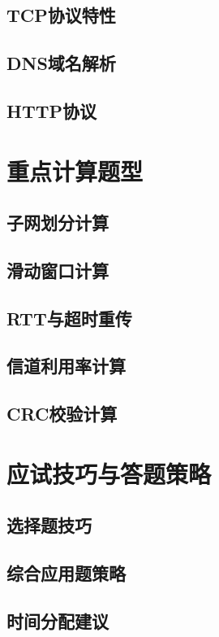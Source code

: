 \documentclass[lang=cn,newtx,10pt,scheme=chinese]{../../elegantbook}
\begin{document}
\subsection{TCP协议特性}
\subsection{DNS域名解析}
\subsection{HTTP协议}

\section{重点计算题型}
\subsection{子网划分计算}
\subsection{滑动窗口计算}
\subsection{RTT与超时重传}
\subsection{信道利用率计算}
\subsection{CRC校验计算}

\section{应试技巧与答题策略}
\subsection{选择题技巧}
\subsection{综合应用题策略}
\subsection{时间分配建议}
\end{document}
